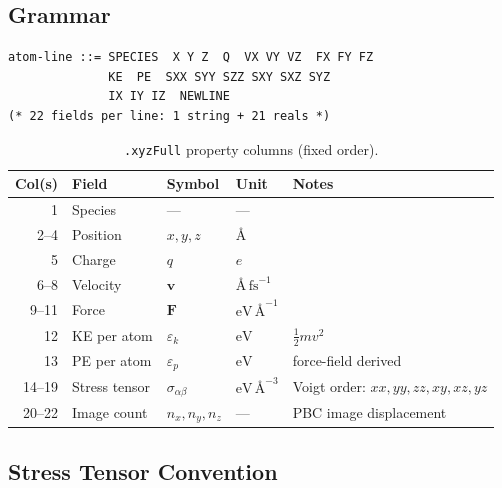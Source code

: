 \documentclass[11pt, a4paper, oneside]{article}
\newcommand{\ang}{\text{\AA}}
\newcommand{\fs}{\text{fs}}
\newcommand{\eV}{\text{eV}}
\begin{document}
\subsection{Grammar}
\label{sec:xyzFull_grammar}

\begin{lstlisting}[caption={\texttt{.xyzFull} atom-line grammar.}]
atom-line ::= SPECIES  X Y Z  Q  VX VY VZ  FX FY FZ
              KE  PE  SXX SYY SZZ SXY SXZ SYZ
              IX IY IZ  NEWLINE
(* 22 fields per line: 1 string + 21 reals *)
\end{lstlisting}

\begin{table}[h]
\centering
\begin{tabular}{rllll}
  \toprule
  Col(s) & Field & Symbol & Unit & Notes \\
  \midrule
  1      & Species     & ---       & ---                       & \\
  2--4   & Position    & $x,y,z$   & $\ang$                    & \\
  5      & Charge      & $q$       & $e$                       & \\
  6--8   & Velocity    & $\mathbf{v}$ & $\ang\,\fs^{-1}$      & \\
  9--11  & Force       & $\mathbf{F}$ & $\eV\,\ang^{-1}$      & \\
  12     & KE per atom & $\varepsilon_k$ & $\eV$              & $\frac{1}{2}mv^2$ \\
  13     & PE per atom & $\varepsilon_p$ & $\eV$              & force-field derived \\
  14--19 & Stress tensor & $\sigma_{\alpha\beta}$ & $\eV\,\ang^{-3}$ & Voigt order: $xx,yy,zz,xy,xz,yz$ \\
  20--22 & Image count & $n_x,n_y,n_z$ & ---                 & PBC image displacement \\
  \bottomrule
\end{tabular}
\caption{\texttt{.xyzFull} property columns (fixed order).}
\label{tab:xyzFull_cols}
\end{table}

\subsection{Stress Tensor Convention}
\label{sec:xyzFull_stress}
\end{document}
